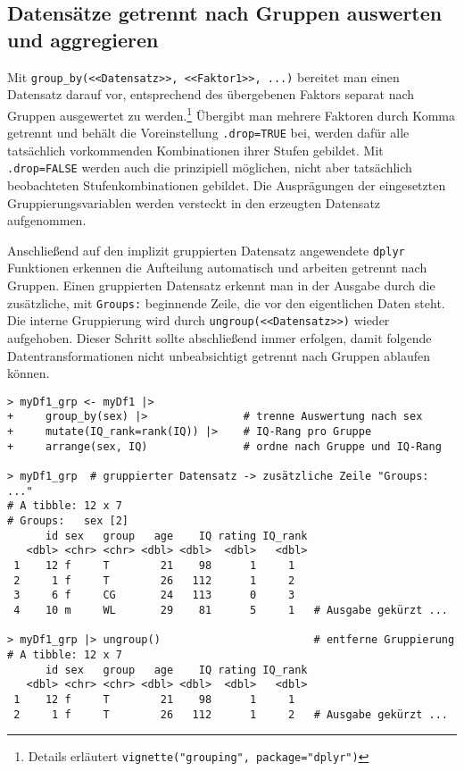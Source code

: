 \subsection{Datensätze getrennt nach Gruppen auswerten und aggregieren}
\label{sec:dplyr_aggregate}

Mit \lstinline!group_by(<<Datensatz>>, <<Faktor1>>, ...)! bereitet man einen Datensatz darauf vor, entsprechend des übergebenen Faktors separat nach Gruppen ausgewertet zu werden.\footnote{Details erläutert \lstinline!vignette("grouping", package="dplyr")!} Übergibt man mehrere Faktoren durch Komma getrennt und behält die Voreinstellung \lstinline!.drop=TRUE! bei, werden dafür alle tatsächlich vorkommenden Kombinationen ihrer Stufen gebildet. Mit \lstinline!.drop=FALSE! werden auch die prinzipiell möglichen, nicht aber tatsächlich beobachteten Stufenkombinationen gebildet. Die Ausprägungen der eingesetzten Gruppierungsvariablen werden versteckt in den erzeugten Datensatz aufgenommen.

Anschließend auf den implizit gruppierten Datensatz angewendete \lstinline!dplyr! Funktionen erkennen die Aufteilung automatisch und arbeiten getrennt nach Gruppen. Einen gruppierten Datensatz erkennt man in der Ausgabe durch die zusätzliche, mit \lstinline!Groups:! beginnende Zeile, die vor den eigentlichen Daten steht. Die interne Gruppierung wird durch \lstinline!ungroup(<<Datensatz>>)! wieder aufgehoben. Dieser Schritt sollte abschließend immer erfolgen, damit folgende Datentransformationen nicht unbeabsichtigt getrennt nach Gruppen ablaufen können.
\begin{lstlisting}
> myDf1_grp <- myDf1 |>
+     group_by(sex) |>               # trenne Auswertung nach sex
+     mutate(IQ_rank=rank(IQ)) |>    # IQ-Rang pro Gruppe
+     arrange(sex, IQ)               # ordne nach Gruppe und IQ-Rang

> myDf1_grp  # gruppierter Datensatz -> zusätzliche Zeile "Groups: ..."
# A tibble: 12 x 7
# Groups:   sex [2]
      id sex   group   age    IQ rating IQ_rank
   <dbl> <chr> <chr> <dbl> <dbl>  <dbl>   <dbl>
 1    12 f     T        21    98      1     1  
 2     1 f     T        26   112      1     2  
 3     6 f     CG       24   113      0     3  
 4    10 m     WL       29    81      5     1   # Ausgabe gekürzt ...

> myDf1_grp |> ungroup()                        # entferne Gruppierung
# A tibble: 12 x 7
      id sex   group   age    IQ rating IQ_rank
   <dbl> <chr> <chr> <dbl> <dbl>  <dbl>   <dbl>
 1    12 f     T        21    98      1     1  
 2     1 f     T        26   112      1     2   # Ausgabe gekürzt ...
\end{lstlisting}

